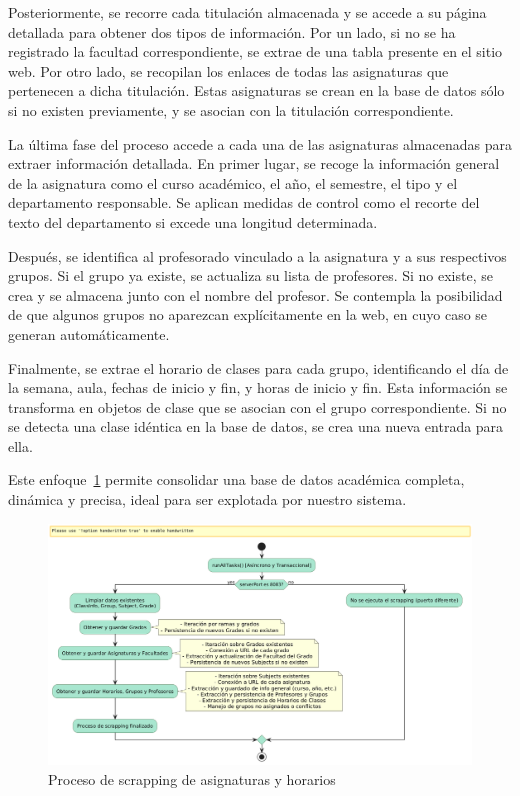 Posteriormente, se recorre cada titulación almacenada y se accede a su página detallada para obtener dos tipos de información. Por un lado, si no se ha registrado la facultad correspondiente, se extrae de una tabla presente en el sitio web. Por otro lado, se recopilan los enlaces de todas las asignaturas que pertenecen a dicha titulación. Estas asignaturas se crean en la base de datos sólo si no existen previamente, y se asocian con la titulación correspondiente.

La última fase del proceso accede a cada una de las asignaturas almacenadas para extraer información detallada. En primer lugar, se recoge la información general de la asignatura como el curso académico, el año, el semestre, el tipo y el departamento responsable. Se aplican medidas de control como el recorte del texto del departamento si excede una longitud determinada.

Después, se identifica al profesorado vinculado a la asignatura y a sus respectivos grupos. Si el grupo ya existe, se actualiza su lista de profesores. Si no existe, se crea y se almacena junto con el nombre del profesor. Se contempla la posibilidad de que algunos grupos no aparezcan explícitamente en la web, en cuyo caso se generan automáticamente.

Finalmente, se extrae el horario de clases para cada grupo, identificando el día de la semana, aula, fechas de inicio y fin, y horas de inicio y fin. Esta información se transforma en objetos de clase que se asocian con el grupo correspondiente. Si no se detecta una clase idéntica en la base de datos, se crea una nueva entrada para ella.

Este enfoque~\ref{fig:scrapping-process} permite consolidar una base de datos académica completa, dinámica y precisa, ideal para ser explotada por nuestro sistema.

\begin{figure}[H]
    \centering
    \includegraphics[width=1\textwidth, trim=0 0 0 45, clip]{figures/07_scrapping.png}
    \caption{Proceso de scrapping de asignaturas y horarios}
    \label{fig:scrapping-process}
\end{figure}

